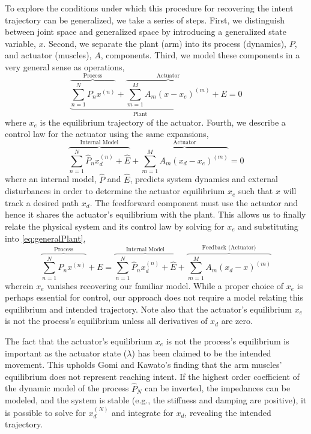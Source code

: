 To explore the conditions under which this procedure for recovering the intent trajectory can be generalized, we take a series of steps. First, we distinguish between joint space and generalized space by introducing a generalized state variable, $x$. Second, we separate the plant (arm) into its process (dynamics), $P$, and actuator (muscles), $A$, components. Third, we model these components in a very general sense as operations,
\begin{equation} \label{eq:generalPlant}
\underbrace{\overbrace{\sum_{n=1}^N P_nx^{(n)}}^\text{Process}+\overbrace{\sum_{m=1}^M A_m(x-x_e)^{(m)}}^\text{Actuator}}_\text{Plant}+E=0
\end{equation}
where $x_e$ is the equilibrium trajectory of the actuator. Fourth, we describe a  control law for the actuator using the same expansions,
\begin{equation}
\overbrace{\sum_{n=1}^N \hat{P}_n x^{(n)}_d+\hat{E}}^\text{Internal Model}+\overbrace{\sum_{m=1}^M A_m(x_d-x_e)^{(m)}}^\text{Actuator}=0
\end{equation}
where an internal model, $\hat{P}$ and $\hat{E}$, predicts system dynamics and external disturbances in order to determine the actuator equilibrium $x_e$ such that $x$ will track a desired path $x_d$. The feedforward component must use the actuator and hence it shares the actuator's equilibrium with the plant. This allows us to finally relate the physical system and its control law by solving for $x_e$ and substituting into \eqref{eq:generalPlant},
\begin{equation}
\overbrace{\sum_{n=1}^N P_nx^{(n)}}^\text{Process}+E=\overbrace{\sum_{n=1}^N \hat{P}_n x^{(n)}_d+\hat{E}}^\text{Internal Model}+\overbrace{\sum_{m=1}^M A_m (x_d-x)^{(m)}}^\text{Feedback (Actuator)}
\end{equation}
wherein $x_e$ vanishes recovering our familiar model. While a proper choice of $x_e$ is perhaps essential for control, our approach does not require a model relating this equilibrium and intended trajectory. Note also that the actuator's equilibrium $x_e$ is not the process's equilibrium unless all derivatives of $x_d$ are zero. 

The fact that the actuator's equilibrium $x_e$ is not the process's equilibrium is important as the actuator state ($\lambda$) has been claimed to be the intended movement\cite{feldman1995origin}. This upholds Gomi and Kawato's finding that the arm muscles' equilibrium does not represent reaching intent\cite{gomi1997human}. If the highest order coefficient of the dynamic model of the process $\hat{P}_N$ can be inverted, the impedances can be modeled, and the system is stable (e.g., the stiffness and damping are positive), it is possible to solve for $x_d^{(N)}$ and integrate for $x_d$, revealing the intended trajectory.

